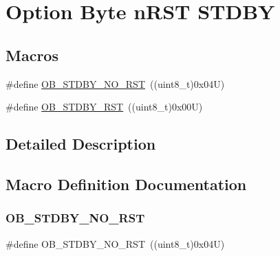 \hypertarget{group___f_l_a_s_h_ex___o_b__n_r_s_t___s_t_d_b_y}{}\section{Option Byte n\+R\+ST S\+T\+D\+BY}
\label{group___f_l_a_s_h_ex___o_b__n_r_s_t___s_t_d_b_y}
\subsection*{Macros}
\begin{DoxyCompactItemize}
\item 
\#define \hyperlink{group___f_l_a_s_h_ex___o_b__n_r_s_t___s_t_d_b_y_gad776ed7b3b9a98013aac9976eedb7e94}{O\+B\+\_\+\+S\+T\+D\+B\+Y\+\_\+\+N\+O\+\_\+\+R\+ST}~((uint8\+\_\+t)0x04\+U)
\item 
\#define \hyperlink{group___f_l_a_s_h_ex___o_b__n_r_s_t___s_t_d_b_y_ga69451a6f69247528f58735c9c83499ce}{O\+B\+\_\+\+S\+T\+D\+B\+Y\+\_\+\+R\+ST}~((uint8\+\_\+t)0x00\+U)
\end{DoxyCompactItemize}


\subsection{Detailed Description}


\subsection{Macro Definition Documentation}
\mbox{\label{group___f_l_a_s_h_ex___o_b__n_r_s_t___s_t_d_b_y_gad776ed7b3b9a98013aac9976eedb7e94}} 
\subsubsection{\texorpdfstring{O\+B\+\_\+\+S\+T\+D\+B\+Y\+\_\+\+N\+O\+\_\+\+R\+ST}{OB\_STDBY\_NO\_RST}}
{\footnotesize\ttfamily \#define O\+B\+\_\+\+S\+T\+D\+B\+Y\+\_\+\+N\+O\+\_\+\+R\+ST~((uint8\+\_\+t)0x04\+U)}

